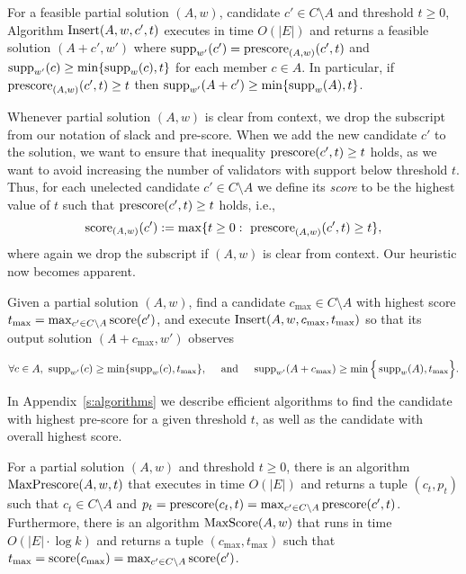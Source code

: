 \begin{lemma}\label{lem:insert}
For a feasible partial solution $(A,w)$, candidate $c'\in C\setminus A$ and threshold $t\geq 0$, 
Algorithm $\operatorname{Insert}(A,w,c',t)$ executes in time $O(|E|)$ and returns a feasible solution $(A+c',w')$ 
where $\operatorname{supp}_{w'}(c')=\operatorname{prescore}_{(A,w)}(c',t)$ and $\operatorname{supp}_{w'}(c)\geq \min\{\operatorname{supp}_w(c),t\}$ for each member $c\in A$. 
In particular, if $\operatorname{prescore}_{(A,w)}(c',t)\geq t$ then $\operatorname{supp}_{w'}(A+c')\geq \min\{\operatorname{supp}_w(A),t\}$.
\end{lemma}

Whenever partial solution $(A,w)$ is clear from context, we drop the subscript from our notation of slack and pre-score. 
When we add the new candidate $c'$ to the solution, we want to ensure that inequality $\operatorname{prescore}(c',t)\geq t$ holds, as we want to avoid increasing the number of validators with support below threshold $t$. 
Thus, for each unelected candidate $c'\in C\setminus A$ we define its \emph{score} to be the highest value of $t$ such that $\operatorname{prescore}(c',t) \geq t$ holds, i.e., 
%
\begin{align}
    \operatorname{score}_{(A,w)}(c'):=\max\{t\geq 0: \ \operatorname{prescore}_{(A,w)}(c',t)\geq t\},
\end{align}
%
where again we drop the subscript if $(A,w)$ is clear from context. Our heuristic now becomes apparent.

\begin{heuristic}[$\phragmms$]
Given a partial solution $(A,w)$, find a candidate $c_{\max}\in C\setminus A$ with highest score $t_{\max}=\max_{c'\in C\setminus A} \operatorname{score}(c')$, and execute $\operatorname{Insert}(A,w,c_{\max},t_{\max})$ so that its output solution $(A+c_{\max},w')$ observes 

$$\forall c\in A, \ \operatorname{supp}_{w'}(c)\geq \min\{\operatorname{supp}_w(c), t_{\max}\}, \quad \text{ and } \quad \operatorname{supp}_{w'}(A+c_{\max})\geq \min \Big\{ \operatorname{supp}_w(A), t_{\max}\Big\}.$$
\end{heuristic}

In Appendix~\ref{s:algorithms} we describe efficient algorithms to find the candidate with highest pre-score for a given threshold $t$, as well as the candidate with overall highest score.

\begin{theorem}\label{thm:runtimes}
For a partial solution $(A,w)$ and threshold $t\geq 0$, there is an algorithm $\operatorname{MaxPrescore}(A,w,t)$ that executes in time $O(|E|)$ and returns a tuple $(c_t,p_t)$ such that $c_t\in C\setminus A$ and $p_t=\operatorname{prescore}(c_t,t)=\max_{c'\in C\setminus A} \operatorname{prescore}(c',t)$.
Furthermore, there is an algorithm $\operatorname{MaxScore}(A,w)$ that runs in time $O(|E|\cdot \log k)$ and returns a tuple $(c_{\max}, t_{\max})$ such that $t_{\max}=\operatorname{score}(c_{\max})=\max_{c'\in C\setminus A} \operatorname{score}(c')$.
\end{theorem}

